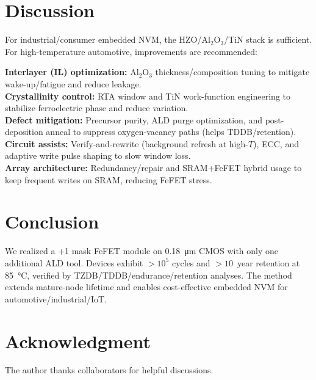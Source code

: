 \documentclass[conference]{IEEEtran}
\begin{document}
\section{Discussion}
For industrial/consumer embedded NVM, the HZO/Al$_2$O$_3$/TiN stack is sufficient. For high-temperature automotive, improvements are recommended:

\textbf{Interlayer (IL) optimization:} Al$_2$O$_3$ thickness/composition tuning to mitigate wake-up/fatigue and reduce leakage.\\
\textbf{Crystallinity control:} RTA window and TiN work-function engineering to stabilize ferroelectric phase and reduce variation.\\
\textbf{Defect mitigation:} Precursor purity, ALD purge optimization, and post-deposition anneal to suppress oxygen-vacancy paths (helps TDDB/retention).\\
\textbf{Circuit assists:} Verify-and-rewrite (background refresh at high-$T$), ECC, and adaptive write pulse shaping to slow window loss.\\
\textbf{Array architecture:} Redundancy/repair and SRAM+FeFET hybrid usage to keep frequent writes on SRAM, reducing FeFET stress.

\section{Conclusion}
We realized a +1 mask FeFET module on \SI{0.18}{\micro\meter} CMOS with only one additional ALD tool. Devices exhibit $>10^{5}$ cycles and $>10$~year retention at \SI{85}{\celsius}, verified by TZDB/TDDB/endurance/retention analyses. The method extends mature-node lifetime and enables cost-effective embedded NVM for automotive/industrial/IoT.

\section*{Acknowledgment}
The author thanks collaborators for helpful discussions.
\end{document}
